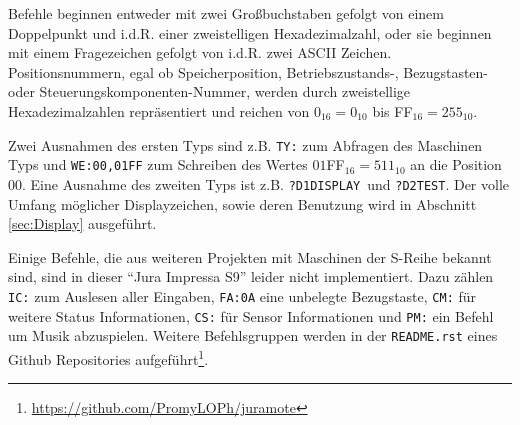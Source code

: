 Befehle beginnen entweder mit zwei Großbuchstaben gefolgt von einem Doppelpunkt und i.d.R. einer zweistelligen Hexadezimalzahl, oder sie beginnen mit einem Fragezeichen gefolgt von i.d.R. zwei ASCII Zeichen.
Positionsnummern, egal ob Speicherposition, \mbox{Betriebszustands-,} Bezugstasten- oder Steuerungskomponenten-Nummer, werden durch zweistellige Hexadezimalzahlen repräsentiert und reichen von $0_{16}=0_{10}$ bis FF$_{16}=255_{10}$.

Zwei Ausnahmen des ersten Typs sind z.B. \texttt{TY:} zum Abfragen des Maschinen Typs und \texttt{WE:00,01FF} zum Schreiben des Wertes $01$FF$_{16} = 511_{10}$ an die Position $00$.
Eine Ausnahme des zweiten Typs ist z.B. \texttt{?D1DISPLAY}\textvisiblespace\ und \texttt{?D2}\textvisiblespace\textvisiblespace\texttt{TEST}\textvisiblespace\textvisiblespace.
Der volle Umfang möglicher Displayzeichen, sowie deren Benutzung wird in Abschnitt \ref{sec:Display} ausgeführt.

Einige Befehle, die aus weiteren Projekten mit Maschinen der S-Reihe bekannt sind, sind in dieser "`Jura Impressa S9"' leider nicht implementiert.
Dazu zählen \texttt{IC:} zum Auslesen aller Eingaben, \texttt{FA:0A} eine unbelegte Bezugstaste, \texttt{CM:} für weitere Status Informationen, \texttt{CS:} für Sensor Informationen und \texttt{PM:} ein Befehl um Musik abzuspielen.
Weitere Befehlsgruppen werden in der \texttt{README.rst} eines Github Repositories aufgeführt\footnote{\url{https://github.com/PromyLOPh/juramote}}.

